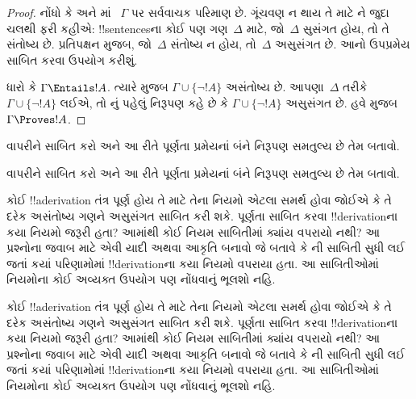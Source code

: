 \documentclass[../../../include/open-logic-section]{subfiles}
\begin{document}
\begin{proof}
નોંધો કે  અને માં
~$\Gamma$ પર સર્વવાચક પરિમાણ છે. ગૂંચવણ ન થાય તે માટે
ને જુદા ચલથી ફરી કહીએ: !!{sentence}sના કોઈ પણ
ગણ~$\Delta$ માટે, જો~$\Delta$ સુસંગત હોય, તો તે સંતોષ્ય છે.
પ્રતિપક્ષન મુજબ, જો~$\Delta$ સંતોષ્ય ન હોય, તો~$\Delta$ અસુસંગત છે. આનો
ઉપપ્રમેય સાબિત કરવા ઉપયોગ કરીશું.

ધારો કે $\Gamma\Entails !A$. ત્યારે 
મુજબ $\Gamma\cup\{\lnot !A\}$ અસંતોષ્ય છે. આપણા~$\Delta$ તરીકે
$\Gamma\cup\{\lnot !A\}$ લઈએ, તો નું પહેલું
નિરૂપણ કહે છે કે $\Gamma\cup\{\lnot !A\}$ અસુસંગત છે. હવે
મુજબ $\Gamma\Proves !A$.
\end{proof}

\begin{prob}
 વાપરીને
 સાબિત કરો અને આ રીતે પૂર્ણતા
પ્રમેયનાં બંને નિરૂપણ સમતુલ્ય છે તેમ બતાવો.
\end{prob}
\tagendprob

\begin{prob}
 વાપરીને
 સાબિત કરો અને આ રીતે પૂર્ણતા
પ્રમેયનાં બંને નિરૂપણ સમતુલ્ય છે તેમ બતાવો.
\end{prob}
\tagendprob

\begin{prob}
કોઈ !!a{derivation} તંત્ર પૂર્ણ હોય તે માટે તેના નિયમો એટલા સમર્થ હોવા
જોઈએ કે તે દરેક અસંતોષ્ય ગણને અસુસંગત સાબિત કરી શકે. પૂર્ણતા સાબિત કરવા
!!{derivation}ના કયા નિયમો જરૂરી હતા? આમાંથી કોઈ નિયમ સાબિતીમાં ક્યાંય
વપરાયો નથી? આ પ્રશ્નોના જવાબ માટે એવી યાદી અથવા આકૃતિ બનાવો જે બતાવે
કે ની સાબિતી સુધી લઈ જતાં કયાં
પરિણામોમાં !!{derivation}ના કયા નિયમો વપરાયા હતા. આ સાબિતીઓમાં નિયમોના
કોઈ અવ્યક્ત ઉપયોગ પણ નોંધવાનું ભૂલશો નહિ.
\end{prob}
\tagendprob

\begin{prob}
કોઈ !!a{derivation} તંત્ર પૂર્ણ હોય તે માટે તેના નિયમો એટલા સમર્થ હોવા
જોઈએ કે તે દરેક અસંતોષ્ય ગણને અસુસંગત સાબિત કરી શકે. પૂર્ણતા સાબિત કરવા
!!{derivation}ના કયા નિયમો જરૂરી હતા? આમાંથી કોઈ નિયમ સાબિતીમાં ક્યાંય
વપરાયો નથી? આ પ્રશ્નોના જવાબ માટે એવી યાદી અથવા આકૃતિ બનાવો જે બતાવે
કે ની સાબિતી સુધી લઈ જતાં કયાં
પરિણામોમાં !!{derivation}ના કયા નિયમો વપરાયા હતા. આ સાબિતીઓમાં નિયમોના
કોઈ અવ્યક્ત ઉપયોગ પણ નોંધવાનું ભૂલશો નહિ.
\end{prob}
\tagendprob
\end{document}
